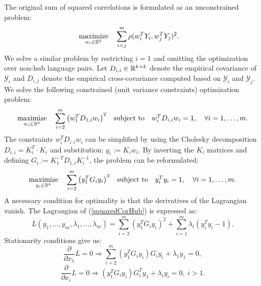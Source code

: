 The original sum of squared correlations is formulated as an unconstrained problem:
\begin{equation*}
  \begin{aligned}
    & \underset{w_i \in \mathbb{R}^{k}}{\text{maximize}}
    & & \sum_{i < j}^m  \rho(w_i^T Y_i, w_j^T Y_j)^2.
\end{aligned}
\end{equation*}
We solve a similar problem by restricting $i=1$ and omitting the optimization over non-hub 
language pairs. Let $D_{i,i} \in \mathbb{R}^{k \times k}$ denote the empirical covariance of 
$\mathcal{Y}_i$ and $D_{i,j}$ denote the empirical cross-covariance computed based on 
$\mathcal{Y}_i$ and $\mathcal{Y}_j$. We solve the following constrained (unit variance 
constraints) optimization problem:
\begin{equation}\label{squaredCorHubOriginal}
  \begin{aligned}
    & \underset{w_i \in \mathbb{R}^{k}}{\text{maximize}}
    & & \sum_{i = 2}^m  \left(w_1^T D_{1,i} w_i \right)^2
    & \text{subject to}
    & & w_i^T D_{i,i} w_i = 1, \quad\forall i = 1,\ldots, m.
\end{aligned}
\end{equation}
The constraints $w_i^T D_{i,i} w_i$ can be simplified by using the Cholesky decomposition 
$D_{i,i} = K_i^T \cdot K_i$ and substitution: $y_i := K_i w_i$. By inverting the $K_i$ 
matrices and defining  $G_i := K_1^{-T} D_{1,i} K_i^{-1}$, the problem can be reformulated:
\begin{equation}\label{squaredCorHub}
  \begin{aligned}
    & \underset{y_i \in \mathbb{R}^{k}}{\text{maximize}}
    & & \sum_{i = 2}^m  \left(y_1^T G_{i} y_i \right)^2
    & \text{subject to}
    & & y_i^T y_i = 1, \quad\forall i = 1,\ldots, m.
\end{aligned}
\end{equation}
A necessary condition for optimality is that the derivatives of the Lagrangian vanish. 
The Lagrangian of (\ref{squaredCorHub}) is expressed as:
$$  L(y_1, \ldots, y_m, \lambda_1, \ldots, \lambda_m) = 
\sum_{i = 2}^m  \left(y_1^T G_{i} y_i \right)^2 + \sum_{i=1}^m \lambda_i \left(y_i^T y_i - 1\right).$$
Stationarity conditions give us:
\begin{equation}\label{dLdx1}
 \frac{\partial}{\partial x_1} L = 0 \Rightarrow 
 \sum_{i = 2}^m  \left(y_1^T G_{i} y_i \right) G_i y_i + \lambda_1 y_1 = 0,
\end{equation}
\begin{equation}\label{dLdxi}
\frac{\partial}{\partial x_i} L = 0 \Rightarrow 
\left(y_1^T G_{i} y_i \right) G_{i}^T y_1 + \lambda_i y_i = 0,~i > 1.
\end{equation}
